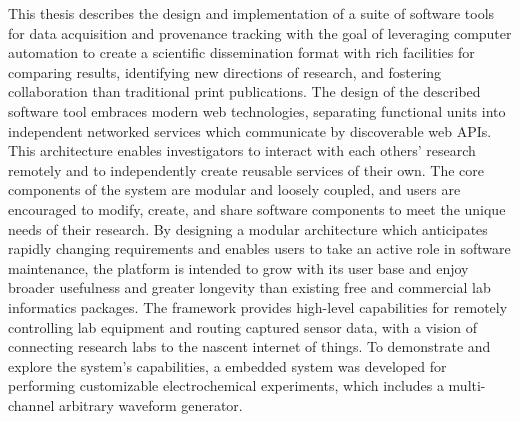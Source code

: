 This thesis describes the design and implementation of a suite of
software tools for data acquisition and provenance
tracking with the goal of leveraging computer automation to create a
scientific dissemination format with rich facilities for
comparing results, identifying new directions of research, and fostering
collaboration than traditional print publications. The design of the
described software tool embraces modern web technologies, separating
functional units into independent networked services which communicate
by discoverable web APIs. This architecture enables investigators to
interact with each others' research remotely and to independently
create reusable services of their own. The core components of the system are
modular and loosely coupled, and users are encouraged to modify,
create, and share software components to meet the unique needs of
their research. By designing a modular architecture which anticipates rapidly
changing requirements and enables users to take an active role in
software maintenance, the platform is intended to grow with its user
base and enjoy broader usefulness and greater longevity than existing
free and commercial lab informatics packages.
The framework provides high-level capabilities for
remotely controlling lab equipment and routing captured sensor data,
with a vision of connecting research labs to the nascent internet of
things. To demonstrate and explore the system's capabilities, a
embedded system was developed for performing customizable
electrochemical experiments, which includes a multi-channel arbitrary
waveform generator.